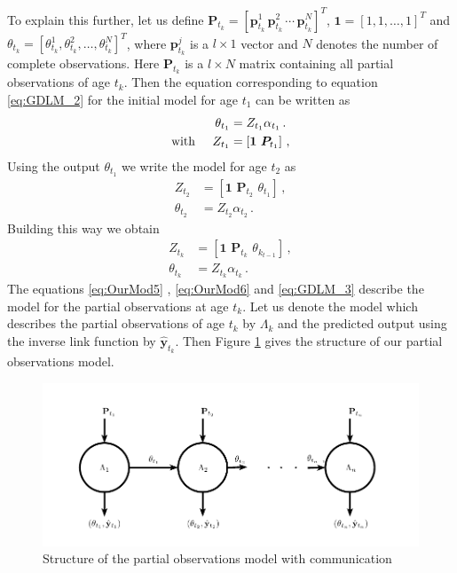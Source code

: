 \documentclass[a4paper,11pt]{article}
\begin{document}
To explain this further, let us define $\bm{P}_{t_k} = \left[ \bm{p}^1_{t_k}\, \bm{p}^2_{t_k}\, \cdots \, \bm{p}^N_{t_k} \right]^T$, $\bm{1} = \left[ 1, 1, \dots, 1\right]^T$ and $\theta_{t_k} = \left[\theta^1_{t_k}, \theta^2_{t_k}, \dots, \theta^N_{t_k} \right]^T$, where $\bm{p}^j_{t_k}$ is a $l \times 1 $ vector and $N$ denotes the number of complete observations. Here $\bm{P}_{t_k}$ is a $l \times N$ matrix containing all partial observations of age $t_k$. Then the equation corresponding to equation \eqref{eq:GDLM_2} for the initial model for age $t_1$ can be written as
\begin{align}
	\theta_{t_1}                       & = Z_{t_1} \alpha_{t_1} \, . \label{eq:OurMod2}                     \\
	\text{with} \hspace{0.5cm} Z_{t_1} & = \left[ \bm{1} \, \, \bm{P}_{t_1} \right] \, , \label{eq:OurMod1}
\end{align}
Using the output $\theta_{t_1}$ we write the model for age $t_2$ as
\begin{align}
	Z_{t_2}      & = \left[ \bm{1} \, \, \bm{P}_{t_2} \, \, \theta_{t_1} \right] \, ,\label{eq:OurMod3} \\
	\theta_{t_2} & = Z_{t_2} \alpha_{t_2} \, . \label{eq:OurMod4}
\end{align}
Building this way we obtain
\begin{align}
	Z_{t_k}      & = \left[ \bm{1} \, \, \bm{P}_{t_k} \, \, \theta_{k_{t-1}} \right] \, , \label{eq:OurMod5} \\
	\theta_{t_k} & = Z_{t_k} \alpha_{t_k} \, . \label{eq:OurMod6}
\end{align}
The equations \eqref{eq:OurMod5} , \eqref{eq:OurMod6} and \eqref{eq:GDLM_3} describe the model for the partial observations at age $t_k$. Let us denote the model which describes the partial observations of age $t_k$ by $\Lambda_k$ and the predicted output using the inverse link function by $\hat{\bm{y}}_{t_k}$. Then Figure \ref{fig:PODLM} gives the structure of our partial observations model.

\begin{figure}[H]
	\centering
	\includegraphics[clip=true,scale=0.8]{./Graphics/Lots_of_circles_3.pdf}
	\caption{\footnotesize Structure of the partial observations model with communication}
	\label{fig:PODLM}
\end{figure}
\end{document}
